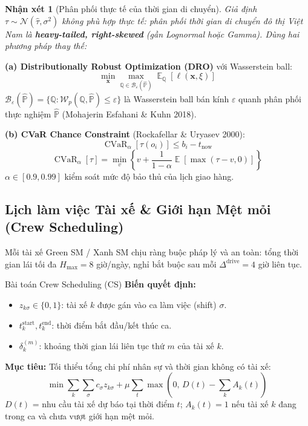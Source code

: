 \documentclass[12pt,a4paper]{article}
\newtheorem{remark}{Nhận xét}[section]
\DeclareMathOperator*{\E}{\mathbb{E}}
\DeclareMathOperator{\CVaR}{CVaR}
\begin{document}
\begin{remark}[Phân phối thực tế của thời gian di chuyển]
Giả định $\tau\sim\mathcal{N}(\hat{\tau},\sigma^2)$ không phù hợp thực tế:
phân phối thời gian di chuyển đô thị Việt Nam là \textbf{heavy-tailed, right-skewed}
(gần Lognormal hoặc Gamma). Dùng hai phương pháp thay thế:
\end{remark}

\textbf{(a) Distributionally Robust Optimization (DRO)} với Wasserstein ball:
\begin{equation}
  \min_{\bm{x}}\max_{\mathbb{Q}\in\mathcal{B}_\varepsilon(\hat{\mathbb{P}})}
  \E_{\mathbb{Q}}[\ell(\bm{x},\xi)]
\end{equation}
$\mathcal{B}_\varepsilon(\hat{\mathbb{P}})=\{\mathbb{Q}:\mathcal{W}_p(\mathbb{Q},\hat{\mathbb{P}})\leq\varepsilon\}$
là Wasserstein ball bán kính $\varepsilon$ quanh phân phối thực nghiệm $\hat{\mathbb{P}}$
(Mohajerin Esfahani \& Kuhn 2018).

\textbf{(b) CVaR Chance Constraint} (Rockafellar \& Uryasev 2000):
\begin{equation}
  \CVaR_\alpha[\tau(o_i)] \leq b_i - t_{\mathrm{now}}
\end{equation}
\begin{equation}
  \CVaR_\alpha[\tau] = \min_{v}\left\{v + \frac{1}{1-\alpha}\E[\max(\tau-v,0)]\right\}
\end{equation}
$\alpha\in[0.9,0.99]$ kiểm soát mức độ bảo thủ của lịch giao hàng.

\subsection{Lịch làm việc Tài xế \& Giới hạn Mệt mỏi (Crew Scheduling)}

Mỗi tài xế Green SM / Xanh SM chịu ràng buộc pháp lý và an toàn:
tổng thời gian lái tối đa $H_{\max}=8$ giờ/ngày, nghỉ bắt buộc sau mỗi
$\Delta^{\mathrm{drive}}=4$ giờ liên tục.

\begin{definitionbox}{Bài toán Crew Scheduling (CS)}
\textbf{Biến quyết định:}
\begin{itemize}
  \item $z_{k\sigma}\in\{0,1\}$: tài xế $k$ được gán vào ca làm việc (shift) $\sigma$.
  \item $t_k^{\mathrm{start}}, t_k^{\mathrm{end}}$: thời điểm bắt đầu/kết thúc ca.
  \item $\delta_k^{(m)}$: khoảng thời gian lái liên tục thứ $m$ của tài xế $k$.
\end{itemize}

\textbf{Mục tiêu:} Tối thiểu tổng chi phí nhân sự và thời gian không có tài xế:
\begin{equation}
  \min \sum_k \sum_\sigma c_\sigma z_{k\sigma}
  + \mu \sum_{t}\max\!\left(0,\, D(t) - \sum_k A_k(t)\right)
\end{equation}
$D(t)$ = nhu cầu tài xế dự báo tại thời điểm $t$;
$A_k(t)=1$ nếu tài xế $k$ đang trong ca và chưa vượt giới hạn mệt mỏi.
\end{definitionbox}
\end{document}
